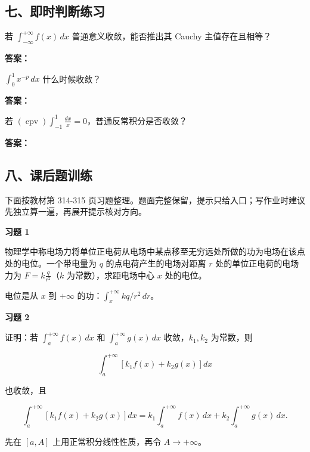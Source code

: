 \subsection*{七、即时判断练习}

\begin{quickcheck}
若 \(\int_{-\infty}^{+\infty} f(x)\,dx\) 普通意义收敛，能否推出其 Cauchy 主值存在且相等？

\tcblower
\textbf{答案：}
\end{quickcheck}

\begin{quickcheck}
\(\int_0^1 x^{-p}\,dx\) 什么时候收敛？

\tcblower
\textbf{答案：}
\end{quickcheck}

\begin{quickcheck}
若 \((\operatorname{cpv})\int_{-1}^{1}\frac{dx}{x}=0\)，普通反常积分是否收敛？

\tcblower
\textbf{答案：}
\end{quickcheck}

\subsection*{八、课后题训练}

下面按教材第 314-315 页习题整理。题面完整保留，提示只给入口；写作业时建议先独立算一遍，再展开提示核对方向。

\begin{exercisebox}
\textbf{习题 1 }

物理学中称电场力将单位正电荷从电场中某点移至无穷远处所做的功为电场在该点处的电位。一个带电量为 \(q\) 的点电荷产生的电场对距离 \(r\) 处的单位正电荷的电场力为 \(F=k\frac{q}{r^2}\)（\(k\) 为常数），求距电场中心 \(x\) 处的电位。

\begin{hintbox}
电位是从 \(x\) 到 \(+\infty\) 的功：\(\int_x^{+\infty}kq/r^2\,dr\)。
\end{hintbox}
\end{exercisebox}

\begin{exercisebox}
\textbf{习题 2 }

证明：若 \(\int_a^{+\infty}f(x)\,dx\) 和 \(\int_a^{+\infty}g(x)\,dx\) 收敛，\(k_1,k_2\) 为常数，则

\[
        \int_a^{+\infty}\left[k_1f(x)+k_2g(x)\right]dx
      \]

也收敛，且

\[
        \int_a^{+\infty}\left[k_1f(x)+k_2g(x)\right]dx
        =
        k_1\int_a^{+\infty}f(x)\,dx+
        k_2\int_a^{+\infty}g(x)\,dx.
      \]

\begin{hintbox}
先在 \([a,A]\) 上用正常积分线性性质，再令 \(A\to+\infty\)。
\end{hintbox}
\end{exercisebox}

